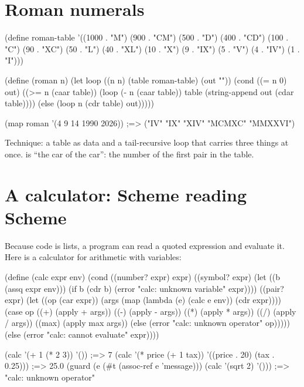 \section{Roman numerals}

\begin{scm}
(define roman-table
  '((1000 . "M") (900 . "CM") (500 . "D") (400 . "CD") (100 . "C")
    (90 . "XC") (50 . "L") (40 . "XL") (10 . "X") (9 . "IX")
    (5 . "V") (4 . "IV") (1 . "I")))

(define (roman n)
  (let loop ((n n) (table roman-table) (out ""))
    (cond ((= n 0) out)
          ((>= n (caar table))
           (loop (- n (caar table)) table (string-append out (cdar table))))
          (else (loop n (cdr table) out)))))

(map roman '(4 9 14 1990 2026))
;=> ("IV" "IX" "XIV" "MCMXC" "MMXXVI")
\end{scm}

Technique: a table as data and a tail-recursive loop that carries three
things at once.  is ``the car of the car'': the number of the
first pair in the table.

\section{A calculator: Scheme reading Scheme}

Because code is lists, a program can read a quoted expression and
evaluate it. Here is a calculator for arithmetic with variables:

\begin{scm}
(define (calc expr env)
  (cond ((number? expr) expr)
        ((symbol? expr)
         (let ((b (assq expr env)))
           (if b (cdr b) (error "calc: unknown variable" expr))))
        ((pair? expr)
         (let ((op (car expr))
               (args (map (lambda (e) (calc e env)) (cdr expr))))
           (case op
             ((+) (apply + args))
             ((-) (apply - args))
             ((*) (apply * args))
             ((/) (apply / args))
             ((max) (apply max args))
             (else (error "calc: unknown operator" op)))))
        (else (error "calc: cannot evaluate" expr))))

(calc '(+ 1 (* 2 3)) '())                           ;=> 7
(calc '(* price (+ 1 tax)) '((price . 20) (tax . 0.25)))  ;=> 25.0
(guard (e (#t (assoc-ref e 'message)))
  (calc '(sqrt 2) '()))                             ;=> "calc: unknown operator"
\end{scm}

